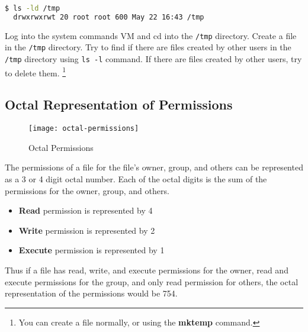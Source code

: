 \begin{lstlisting}[language=bash]
  $ ls -ld /tmp
  drwxrwxrwt 20 root root 600 May 22 16:43 /tmp
\end{lstlisting}

\begin{exercise}
  Log into the system commands VM and cd into the \texttt{/tmp} directory.
  Create a file in the \texttt{/tmp} directory.
  Try to find if there are files created by other users in the \texttt{/tmp} directory using \texttt{ls -l} command.
  If there are files created by other users, try to delete them.
  \footnote{
    You can create a file normally, or using the \textbf{mktemp} command.
  }
\end{exercise}

\subsection{Octal Representation of Permissions}

\begin{figure}
  \texttt{[image: octal-permissions]}
  \caption[Octal Permissions]{Octal Permissions}
\end{figure}

The permissions of a file for the file's owner, group, and others can be represented as a 3 or 4 digit octal number.
Each of the octal digits is the sum of the permissions for the owner, group, and others.

\begin{itemize}
  \item \textbf{Read} permission is represented by 4
  \item \textbf{Write} permission is represented by 2
  \item \textbf{Execute} permission is represented by 1
\end{itemize}

Thus if a file has read, write, and execute permissions for the owner, read and execute permissions for the group, and only read permission for others, the octal representation of the permissions would be 754.

